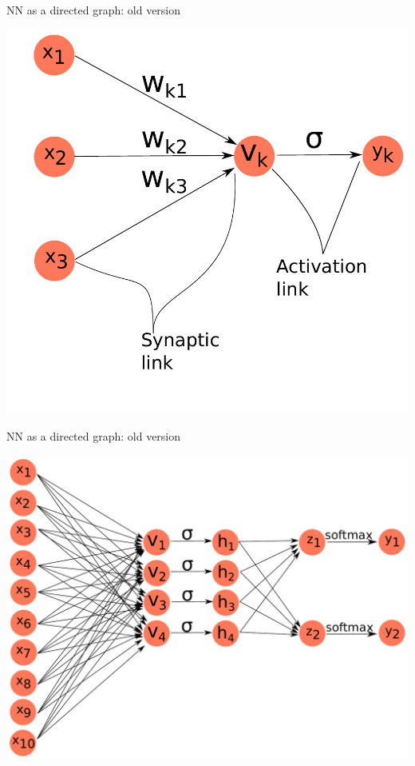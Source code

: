 \documentclass[10pt]{beamer}
\begin{document}
\begin{frame}[fragile]{NN as a directed graph: old version}
\begin{center}
\includegraphics[scale=0.56]{images/OldNN1.pdf}
\end{center}
\end{frame}

\begin{frame}[fragile]{NN as a directed graph: old version}
\begin{center}
\includegraphics[scale=0.44]{images/OldNN2.pdf}
\end{center}
\end{frame}
\end{document}
